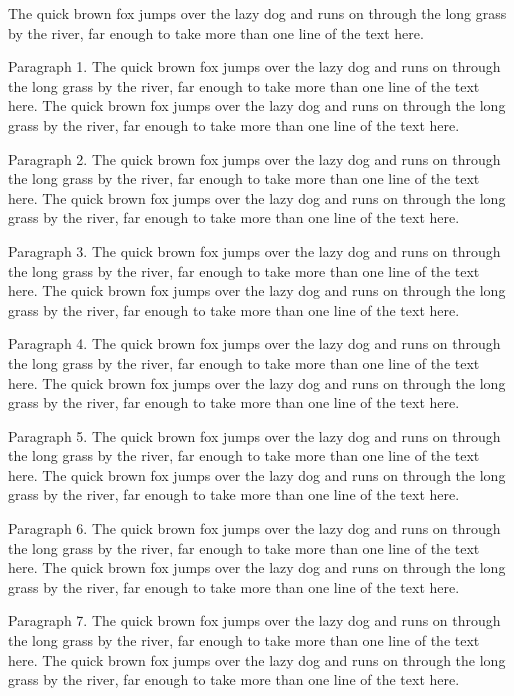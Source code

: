 \documentclass{article}
\begin{document}
The quick brown fox jumps over the lazy dog and runs on through the long grass by the river, far enough to take more than one line of the text here.

\small
Paragraph 1. The quick brown fox jumps over the lazy dog and runs on through the long grass by the river, far enough to take more than one line of the text here. The quick brown fox jumps over the lazy dog and runs on through the long grass by the river, far enough to take more than one line of the text here.

Paragraph 2. The quick brown fox jumps over the lazy dog and runs on through the long grass by the river, far enough to take more than one line of the text here. The quick brown fox jumps over the lazy dog and runs on through the long grass by the river, far enough to take more than one line of the text here.

Paragraph 3. The quick brown fox jumps over the lazy dog and runs on through the long grass by the river, far enough to take more than one line of the text here. The quick brown fox jumps over the lazy dog and runs on through the long grass by the river, far enough to take more than one line of the text here.

Paragraph 4. The quick brown fox jumps over the lazy dog and runs on through the long grass by the river, far enough to take more than one line of the text here. The quick brown fox jumps over the lazy dog and runs on through the long grass by the river, far enough to take more than one line of the text here.

Paragraph 5. The quick brown fox jumps over the lazy dog and runs on through the long grass by the river, far enough to take more than one line of the text here. The quick brown fox jumps over the lazy dog and runs on through the long grass by the river, far enough to take more than one line of the text here.

Paragraph 6. The quick brown fox jumps over the lazy dog and runs on through the long grass by the river, far enough to take more than one line of the text here. The quick brown fox jumps over the lazy dog and runs on through the long grass by the river, far enough to take more than one line of the text here.

Paragraph 7. The quick brown fox jumps over the lazy dog and runs on through the long grass by the river, far enough to take more than one line of the text here. The quick brown fox jumps over the lazy dog and runs on through the long grass by the river, far enough to take more than one line of the text here.
\end{document}
